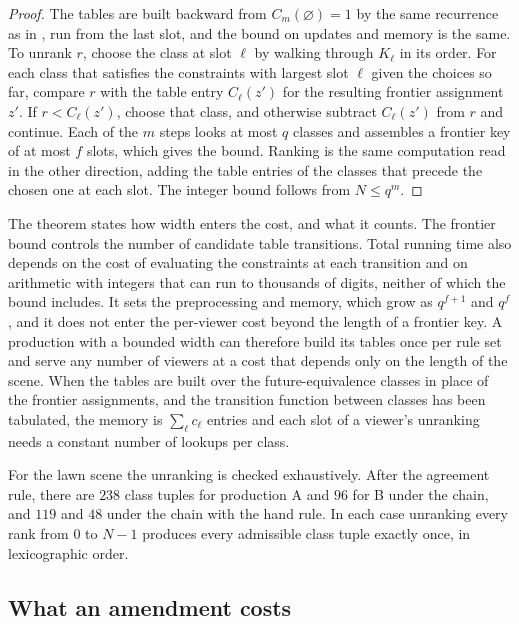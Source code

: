 \documentclass[11pt,twoside,openright]{book}
\theoremstyle{plain}
\theoremstyle{definition}
\theoremstyle{remark}
\begin{document}
\begin{proof}
The tables are built backward from $C_m(\varnothing)=1$ by the same recurrence as in , run from the last slot, and the bound on updates and memory is the same. To unrank $r$, choose the class at slot $\ell$ by walking through $K_\ell$ in its order. For each class that satisfies the constraints with largest slot $\ell$ given the choices so far, compare $r$ with the table entry $C_\ell(z')$ for the resulting frontier assignment $z'$. If $r<C_\ell(z')$, choose that class, and otherwise subtract $C_\ell(z')$ from $r$ and continue. Each of the $m$ steps looks at most $q$ classes and assembles a frontier key of at most $f$ slots, which gives the bound. Ranking is the same computation read in the other direction, adding the table entries of the classes that precede the chosen one at each slot. The integer bound follows from $N\le q^m$.
\end{proof}

The theorem states how width enters the cost, and what it counts. The frontier bound controls the number of candidate table transitions. Total running time also depends on the cost of evaluating the constraints at each transition and on arithmetic with integers that can run to thousands of digits, neither of which the bound includes. It sets the preprocessing and memory, which grow as $q^{f+1}$ and $q^f$, and it does not enter the per-viewer cost beyond the length of a frontier key. A production with a bounded width can therefore build its tables once per rule set and serve any number of viewers at a cost that depends only on the length of the scene. When the tables are built over the future-equivalence classes in place of the frontier assignments, and the transition function between classes has been tabulated, the memory is $\sum_\ell c_\ell$ entries and each slot of a viewer's unranking needs a constant number of lookups per class.

For the lawn scene the unranking is checked exhaustively. After the agreement rule, there are $238$ class tuples for production A and $96$ for B under the chain, and $119$ and $48$ under the chain with the hand rule. In each case unranking every rank from $0$ to $N-1$ produces every admissible class tuple exactly once, in lexicographic order.

\subsection{What an amendment costs}
\end{document}
